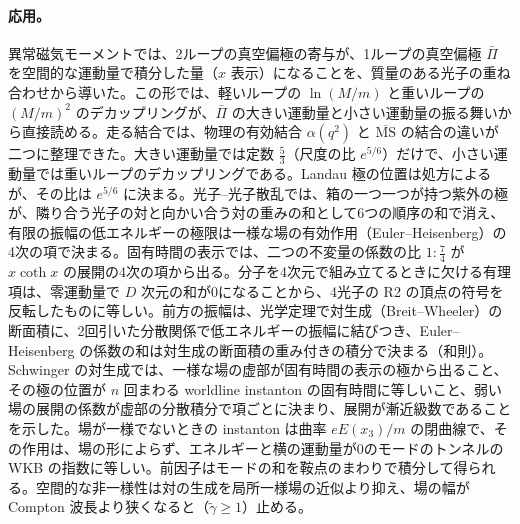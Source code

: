 \documentclass[a4paper,10pt]{ltjsarticle}
\newcommand{\MSbar}{\overline{\mathrm{MS}}}
\begin{document}
\paragraph{応用。}異常磁気モーメントでは、2ループの真空偏極の寄与が、1ループの真空偏極 $\bar\Pi$ を空間的な運動量で積分した量（$x$ 表示）になることを、質量のある光子の重ね合わせから導いた。この形では、軽いループの $\ln(M/m)$ と重いループの $(M/m)^2$ のデカップリングが、$\bar\Pi$ の大きい運動量と小さい運動量の振る舞いから直接読める。走る結合では、物理の有効結合 $\alpha(q^2)$ と $\MSbar$ の結合の違いが二つに整理できた。大きい運動量では定数 $\frac53$（尺度の比 $e^{5/6}$）だけで、小さい運動量では重いループのデカップリングである。Landau 極の位置は処方によるが、その比は $e^{5/6}$ に決まる。光子--光子散乱では、箱の一つ一つが持つ紫外の極が、隣り合う光子の対と向かい合う対の重みの和として6つの順序の和で消え、有限の振幅の低エネルギーの極限は一様な場の有効作用（Euler--Heisenberg）の4次の項で決まる。固有時間の表示では、二つの不変量の係数の比 $1:\frac74$ が $x\coth x$ の展開の4次の項から出る。分子を4次元で組み立てるときに欠ける有理項は、零運動量で $D$ 次元の和が0になることから、4光子の R2 の頂点の符号を反転したものに等しい。前方の振幅は、光学定理で対生成（Breit--Wheeler）の断面積に、2回引いた分散関係で低エネルギーの振幅に結びつき、Euler--Heisenberg の係数の和は対生成の断面積の重み付きの積分で決まる（和則）。Schwinger の対生成では、一様な場の虚部が固有時間の表示の極から出ること、その極の位置が $n$ 回まわる worldline instanton の固有時間に等しいこと、弱い場の展開の係数が虚部の分散積分で項ごとに決まり、展開が漸近級数であることを示した。場が一様でないときの instanton は曲率 $eE(x_3)/m$ の閉曲線で、その作用は、場の形によらず、エネルギーと横の運動量が0のモードのトンネルの WKB の指数に等しい。前因子はモードの和を鞍点のまわりで積分して得られる。空間的な非一様性は対の生成を局所一様場の近似より抑え、場の幅が Compton 波長より狭くなると（$\tilde\gamma\ge1$）止める。
\end{document}
